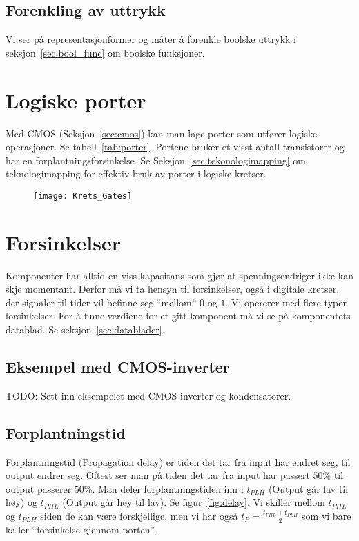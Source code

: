\documentclass[12pt,a4paper,norsk]{article}
\begin{document}
\subsection{Forenkling av uttrykk}
Vi ser på representasjonformer og måter å forenkle boolske uttrykk i
seksjon~\ref{sec:bool_func} om boolske funksjoner.

\section{Logiske porter}\label{sec:logiske_porter}
Med CMOS (Seksjon~\ref{sec:cmos}) kan man lage porter som utfører logiske
operasjoner. Se tabell~\ref{tab:porter}. Portene bruker et visst antall
transistorer og har en forplantningsforsinkelse. Se
Seksjon~\ref{sec:tekonologimapping} om teknologimapping for effektiv bruk av
porter i logiske kretser.

\begin{figure}[hbt!]
  \centering
  \texttt{[image: Krets\_Gates]}
\end{figure}

\section{Forsinkelser}\label{sec:forsinkelser}
Komponenter har alltid en viss kapasitans som gjør at spenningsendriger ikke kan
skje momentant. Derfor må vi ta hensyn til forsinkelser, også i digitale
kretser, der signaler til tider vil befinne seg ``mellom'' $0$ og $1$. Vi
opererer med flere typer forsinkelser. For å finne verdiene for et gitt
komponent må vi se på komponentets datablad. Se seksjon~\ref{sec:datablader}.

\subsection{Eksempel med CMOS-inverter}
TODO\@: Sett inn eksempelet med CMOS-inverter og kondensatorer.

\subsection{Forplantningstid}
Forplantningstid (Propagation delay) er tiden det tar fra input har
endret seg, til output endrer seg. Oftest ser man på tiden det tar fra input har
passert $50\%$ til output passerer $50\%$. Man deler
forplantningstiden inn i $t_{PLH}$ (Output går lav til høy) og $t_{PHL}$ (Output
går høy til lav). Se figur~\ref{fig:delay}. Vi skiller mellom $t_{PHL}$ og
$t_{PLH}$ siden de kan være forskjellige, men vi har også
$t_{P} = \frac{t_{PHL}+t_{PLH}}{2}$ som vi bare kaller ``forsinkelse gjennom porten''.
\end{document}

